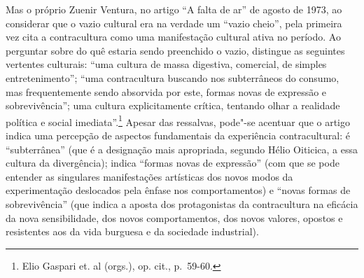 Mas o próprio Zuenir Ventura, no artigo ``A falta de ar'' de agosto de
1973, ao considerar que o vazio cultural era na verdade um ``vazio
cheio'', pela primeira vez cita a contracultura como uma manifestação
cultural ativa no período. Ao perguntar sobre do quê estaria sendo
preenchido o vazio, distingue as seguintes vertentes culturais: ``uma
cultura de massa digestiva, comercial, de simples entretenimento'';
``uma contracultura buscando nos subterrâneos do consumo, mas
frequentemente sendo absorvida por este, formas novas de expressão e
sobrevivência''; uma cultura explicitamente crítica, tentando olhar a
realidade política e social imediata''.\footnote{Elio Gaspari et. al
  (orgs.), op. cit., p.~59-60.} Apesar das ressalvas, pode"-se
acentuar que o artigo indica uma percepção de aspectos fundamentais da
experiência contracultural: é ``subterrânea'' (que é a designação mais
apropriada, segundo Hélio Oiticica, a essa cultura da divergência);
indica ``formas novas de expressão'' (com que se pode entender as
singulares manifestações artísticas dos novos modos da experimentação
deslocados pela ênfase nos comportamentos) e ``novas formas de
sobrevivência'' (que indica a aposta dos protagonistas da contracultura
na eficácia da nova sensibilidade, dos novos comportamentos, dos novos
valores, opostos e resistentes aos da vida burguesa e da sociedade
industrial).

\asterisc

